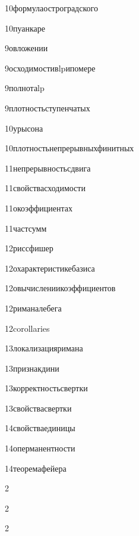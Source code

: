 {10}{формулаостроградского}

{10}{пуанкаре}

{9}{овложении}

{9}{осходимостивlpипомере}

{9}{полнотаlp}

{9}{плотностьступенчатых}

{10}{урысона}

{10}{плотностьнепрерывныхфинитных}

{11}{непрерывностьсдвига}

{11}{свойствасходимости}

{11}{окоэффициентах}

{11}{частсумм}

{12}{риссфишер}

{12}{охарактеристикебазиса}

{12}{овычислениикоэффициентов}

{12}{риманалебега}

{12}{corollaries}

{13}{локализацияримана}

{13}{признакдини}

{13}{корректностьсвертки}

{13}{свойствасвертки}

{14}{свойстваединицы}

{14}{оперманентности}

{14}{теоремафейера}

{2}{}

{2}{}

{2}{}


